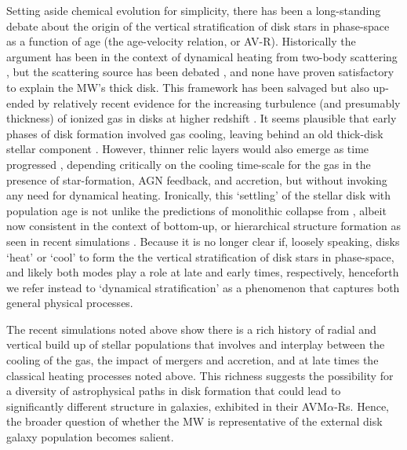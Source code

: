 Setting aside chemical evolution for simplicity, there has been a
long-standing debate about the origin of the vertical stratification
of disk stars in phase-space as a function of age (the age-velocity
relation, or AV-R). Historically the argument has been in the context
of dynamical heating from two-body scattering \citep{Spitzer51}, but
the scattering source has been debated \citep[e.g., giant molecular
  clouds, transient spiral structure, or dwarf satellite
  galaxies][]{Spitzer51,Spitzer53,Wielen77,Quinn93,Binney00}, and none
have proven satisfactory to explain the MW's thick disk.  This
framework has been salvaged but also up-ended by relatively recent
evidence for the increasing turbulence (and presumably thickness) of
ionized gas in disks at higher redshift
\citep{Weiner06,Forster-Schreiber09,Wisnioski15}. It seems plausible
that early phases of disk formation involved gas cooling, leaving
behind an old thick-disk stellar component
\citep{Brook04,Bournaud09}. However, thinner relic layers would also
emerge as time progressed \citep{Bird13}, depending critically on the
cooling time-scale for the gas in the presence of star-formation, AGN
feedback, and accretion, but without invoking any need for dynamical
heating. Ironically, this `settling' of the stellar disk with
population age is not unlike the predictions of monolithic collapse
from \citet{ELS}, albeit now consistent in the context of bottom-up,
or hierarchical structure formation as seen in recent simulations
\citep[e.g.,][]{Bird13,Martig14a}.  Because it is no longer clear if,
loosely speaking, disks `heat' or `cool' to form the the vertical
stratification of disk stars in phase-space, and likely both modes
play a role at late and early times, respectively, henceforth we refer
instead to `dynamical stratification' as a phenomenon that captures
both general physical processes.

The recent simulations noted above show there is a rich history of
radial and vertical build up of stellar populations that involves and
interplay between the cooling of the gas, the impact of mergers and
accretion, and at late times the classical heating processes noted
above.  This richness suggests the possibility for a diversity of
astrophysical paths in disk formation that could lead to significantly
different structure in galaxies, exhibited in their
AVM$\alpha$-Rs. Hence, the broader question of whether the MW is
representative of the external disk galaxy population becomes salient.

